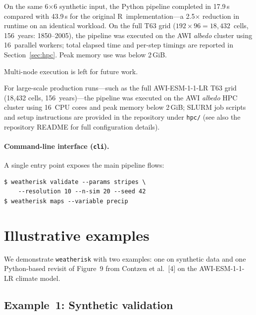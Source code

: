 \documentclass[preprint,12pt,a4paper]{elsarticle}
\newcommand{\rev}[1]{{#1}}
\newcommand{\revb}[1]{{\color{RevisionBlue}#1}}
\newcommand{\revr}[1]{{\color{RevisionRed}#1}}
\begin{document}
On the same 6$\times$6 synthetic input, the Python pipeline
completed in 17.9\,s compared with 43.9\,s for the original
R~implementation---a 2.5$\times$ reduction in runtime on an
identical workload.
On the full T63 grid ($192\times 96 = 18{,}432$~cells, 156~years:
1850--2005), the pipeline was executed on the AWI \emph{albedo}
cluster using 16~parallel workers; total elapsed time and
per-step timings are reported in Section~\ref{sec:hpc}.
Peak memory use was below 2\,GiB.

\revr{Multi-node execution is left for future work.}

For large-scale production runs---such as the full AWI-ESM-1-1-LR
T63 grid (18{,}432 cells, 156~years)---the pipeline was executed on
the AWI \emph{albedo} HPC cluster using 16~CPU cores and peak memory
below 2\,GiB; SLURM job scripts and setup instructions are provided
in the repository under \texttt{hpc/} (see also the repository
README for full configuration details).

\paragraph{Command-line interface (\texttt{cli}).}
A single entry point exposes the main pipeline flows:
\begin{lstlisting}[numbers=none]
$ weatherisk validate --params stripes \
    --resolution 10 --n-sim 20 --seed 42
$ weatherisk maps --variable precip
\end{lstlisting}

\section{Illustrative examples}
\label{sec:examples}

We demonstrate \texttt{weatherisk} with \rev{two} examples: one on
synthetic data \rev{and one \revb{Python-based revisit of Figure~9 from Contzen}
et al.~[4] on the AWI-ESM-1-1-LR climate model}.

\subsection{Example~1: Synthetic validation}
\label{sec:ex-synthetic}
\end{document}
